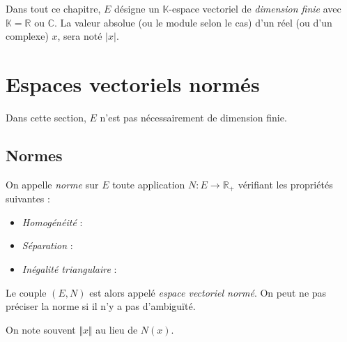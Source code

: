 \documentclass[a4paper,10pt]{report}
\begin{document}


\noindent Dans tout ce chapitre, $E$ désigne un $\mathbb{K}$-espace vectoriel de \textit{dimension finie} avec $\mathbb{K}= \mathbb{R}$ ou $\mathbb{C}$. La valeur absolue (ou le module selon le cas) d'un réel (ou d'un complexe) $x$, sera noté $\vert x \vert$.

 \section{Espaces vectoriels normés}
 
 \noindent Dans cette section, $E$ n'est pas nécessairement de dimension finie.
 
 \subsection{Normes}
 
 \begin{defin} On appelle \textit{norme} sur $E$ toute application $N : E \rightarrow \mathbb{R}_+$ vérifiant les propriétés suivantes :
 
 \begin{itemize}
 \item \textit{Homogénéité} :
 
 \item \textit{Séparation} :
 
 \item \textit{Inégalité triangulaire} :
 
 \end{itemize}
 
\noindent Le couple $(E,N)$ est alors appelé \textit{espace vectoriel normé}. On peut ne pas préciser la norme si il n'y a pas d'ambiguïté.
\end{defin}
 
 \begin{rem} On note souvent $\Vert x \Vert$ au lieu de $N(x)$.
 \end{rem}
 
\end{document}
